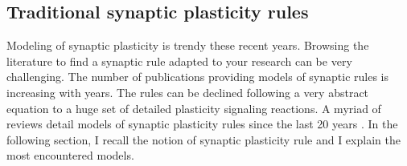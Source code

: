 \subsection{Traditional synaptic plasticity rules}
Modeling of synaptic plasticity
is trendy these recent years. Browsing the literature to find a synaptic rule adapted to your research can be very challenging. The number of publications providing models of synaptic rules is increasing with years. The rules can be declined following a very abstract equation to a huge set of detailed plasticity signaling reactions. A myriad of reviews detail models of synaptic plasticity rules since the last 20 years \citep{morrison_phenomenological_2008, citri_synaptic_2008, feldman_spike-timing_2012, feldman_spike_2020, shouval_models_2007, sjostrom_spike-timing_2010, manninen_postsynaptic_2010, lisman_questions_2010, markram_history_2011, markram_spike-timing-dependent_2012, van_rossum_computational_2013, fusi_limits_2007, senn_spike-timing-dependent_2020, magee_synaptic_2020, chrol-cannon_computational_2014}. In the following section, I recall the notion of synaptic plasticity rule and I explain the most encountered models.


